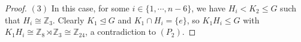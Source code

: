 \documentclass[a4paper,11pt]{amsart}
\numberwithin{equation}{section}
\numberwithin{equation}{subsection}
\begin{document}
\begin{proof}
    




$(3)$ In this case, for some $i\in\{1,\cdots,n-6\}$,  we have $H_i< K_2\leq G$  such that $H_{i} \cong \mathbb{ Z}_3$. Clearly $K_1\trianglelefteq G$ and $K_1 \cap H_{i}= \{e\}$, so $K_1H_i\leq G$ with $K_1H_i\cong \mathbb{Z}_{8}\rtimes \mathbb{Z}_{3}\cong \mathbb{Z}_{24}$, a contradiction to $(P_2)$.
\end{proof} 
\end{document}
